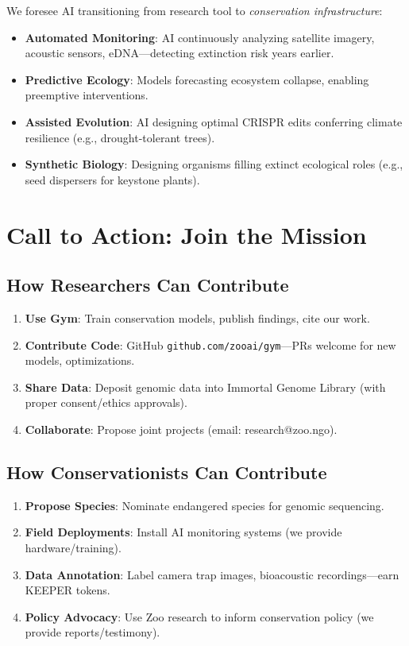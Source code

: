 \documentclass[twocolumn,11pt]{article}
\begin{document}
We foresee AI transitioning from research tool to \textit{conservation infrastructure}:

\begin{itemize}
    \item \textbf{Automated Monitoring}: AI continuously analyzing satellite imagery, acoustic sensors, eDNA—detecting extinction risk years earlier.
    \item \textbf{Predictive Ecology}: Models forecasting ecosystem collapse, enabling preemptive interventions.
    \item \textbf{Assisted Evolution}: AI designing optimal CRISPR edits conferring climate resilience (e.g., drought-tolerant trees).
    \item \textbf{Synthetic Biology}: Designing organisms filling extinct ecological roles (e.g., seed dispersers for keystone plants).
\end{itemize}

\section{Call to Action: Join the Mission}

\subsection{How Researchers Can Contribute}

\begin{enumerate}
    \item \textbf{Use Gym}: Train conservation models, publish findings, cite our work.
    \item \textbf{Contribute Code}: GitHub \texttt{github.com/zooai/gym}—PRs welcome for new models, optimizations.
    \item \textbf{Share Data}: Deposit genomic data into Immortal Genome Library (with proper consent/ethics approvals).
    \item \textbf{Collaborate}: Propose joint projects (email: research@zoo.ngo).
\end{enumerate}

\subsection{How Conservationists Can Contribute}

\begin{enumerate}
    \item \textbf{Propose Species}: Nominate endangered species for genomic sequencing.
    \item \textbf{Field Deployments}: Install AI monitoring systems (we provide hardware/training).
    \item \textbf{Data Annotation}: Label camera trap images, bioacoustic recordings—earn KEEPER tokens.
    \item \textbf{Policy Advocacy}: Use Zoo research to inform conservation policy (we provide reports/testimony).
\end{enumerate}
\end{document}
